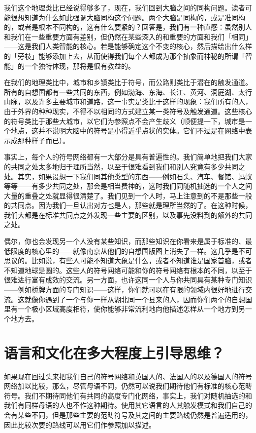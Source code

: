 \documentclass[
  12pt,
  twoside,
  openright,
  oldfontcommands,
]{memoir}
\begin{document}
我们这个地理类比已经说得够多了，现在，我们回到大脑之间的同构问题。读者可能很想知道为什么如此强调大脑同构这个问题。两个大脑是同构的，或是准同构的，或者是根本不同构的，这有什么要紧的？回答是，我们有一种直感：虽然别人和我们在一些重要方面有差别，但仍然在某些深入的和重要的方面和我们「相同」------这是我们人类智能的核心。若是能够确定这个不变的核心，然后描绘出什么样的「旁枝」能够添加上去，从而使得我们每个人都成为那个抽象而神秘的所谓「智能」的一个独特体现，那将是很有教益的。

在我们的地理类比中，城市和乡镇类比于符号，而公路则类比于潜在的触发通道。所有的自想国都有一些共同的东西，例如渤海、东海、长江、黄河、洞庭湖、太行山脉，以及许多主要城市和道路，这一事实是类比于这样的现象：我们所有的人，由于外界的种种现实，不得不以相同的方式建立某一类符号及触发通道。这些核心的符号类比于那些大城市，以它们为参照点不会产生歧义（顺便提一下，城市是一个地点，这并不说明大脑中的符号是小得近乎点状的实体。它们不过是在网络中表示成那种样子而已）。

事实上，每个人的符号网络都有一大部分是具有普遍性的。我们简单地把我们大家的共同之处太多地归于理所当然，以至于很难看到我们和别人究竟有多少共同之处。其实，如果设想一下我们同其他类型的东西------例如石头、汽车、餐馆、蚂蚁等等------有多少共同之处，那会是相当费神的，这时我们同随机抽选的一个人之间大量的重叠之处就显得很清楚了。我们见到一个人时，马上注意到的不是那些一般的共同点。因为我们一旦认出对方也是人，那些就是理所当然的了。在这种时候，我们大都是在标准共同点之外发现一些主要的区别，以及事先没料到的额外的共同之处。

偶尔，你也会发现另一个人没有某些知识，而那些知识在你看来是属于标准的、最低限度的核心里的------就像南京从他们的自想国版图上消失了一样。这几乎是不可思议的。比如说，有些人可能不知道大象是什么，或者不知道谁是国家首脑，或者不知道地球是圆的。这些人的符号网络可能和你的符号网络有根本的不同，以至于很难进行富有成效的交流。另一方面，也许这同一个人与你共同具有某种专门知识------例如桥牌方面的专门知识------这样，你们就可以在有限的领域内很好地进行交流。这就像你遇到了一个与你一样从湖北同一个县来的人，因而你们两个的自想国里有一个极小区域高度相符，使你能够非常流利地向他描述怎样从一个地方到另一个地方去。

\section{语言和文化在多大程度上引导思维？}

如果现在回过头来把我们自己的符号网络和英国人的、法国人的以及德国人的符号网络加以比较，那么，尽管母语不同，仍然可以说我们期待他们有标准的核心范畴符号。我们不期待同他们有共同的高度专门化网络，事实上，我们对随机抽选的和我们有同样母语的人也不作这种期待。使用其它语言的人其触发模式和我们自己的会有某些不同，但是那些主要的范畴符号及其之间的主要路线仍然是普遍适用的，因此比较次要的路线可以用它们作参照加以描述。
\end{document}
